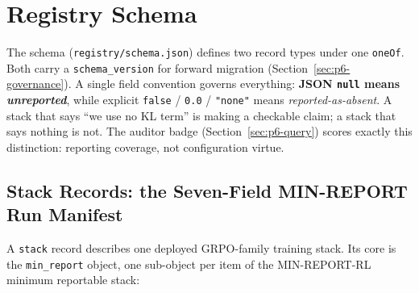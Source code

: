 \section{Registry Schema}
\label{sec:p6-schema}

The schema (\texttt{registry/schema.json}) defines two record types under one
\texttt{oneOf}. Both carry a \texttt{schema\_version} for forward migration
(Section~\ref{sec:p6-governance}). A single field convention governs
everything: \textbf{JSON \texttt{null} means \emph{unreported}}, while explicit
\texttt{false} / \texttt{0.0} / \texttt{"none"} means
\emph{reported-as-absent}. A stack that says ``we use no KL term'' is making a
checkable claim; a stack that says nothing is not. The auditor badge
(Section~\ref{sec:p6-query}) scores exactly this distinction: reporting
coverage, not configuration virtue.

\subsection{Stack Records: the Seven-Field MIN-REPORT Run Manifest}
\label{sec:p6-schema-stack}
A \texttt{stack} record describes one deployed GRPO-family training stack. Its
core is the \texttt{min_report} object, one sub-object per item of the
MIN-REPORT-RL minimum reportable stack:

